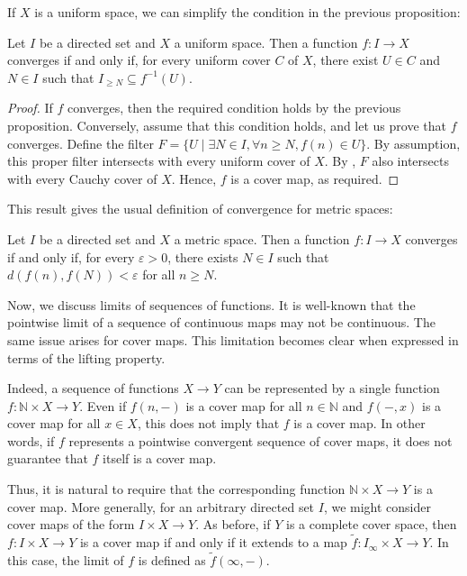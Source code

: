 \documentclass[reqno]{amsart}
\theoremstyle{definition}
\theoremstyle{remark}
\numberwithin{figure}{section}
\begin{document}
If $X$ is a uniform space, we can simplify the condition in the previous proposition:

\begin{prop}
Let $I$ be a directed set and $X$ a uniform space.
Then a function $f : I \to X$ converges if and only if, for every uniform cover $C$ of $X$, there exist $U \in C$ and $N \in I$ such that $I_{\geq N} \subseteq f^{-1}(U)$.
\end{prop}
\begin{proof}
If $f$ converges, then the required condition holds by the previous proposition.
Conversely, assume that this condition holds, and let us prove that $f$ converges.
Define the filter $F = \{ U \mid \exists N \in I, \forall n \geq N, f(n) \in U \}$.
By assumption, this proper filter intersects with every uniform cover of $X$.
By , $F$ also intersects with every Cauchy cover of $X$.
Hence, $f$ is a cover map, as required.
\end{proof}

This result gives the usual definition of convergence for metric spaces:

\begin{cor}
Let $I$ be a directed set and $X$ a metric space.
Then a function $f : I \to X$ converges if and only if, for every $\varepsilon > 0$, there exists $N \in I$ such that $d(f(n),f(N)) < \varepsilon$ for all $n \geq N$.
\end{cor}

Now, we discuss limits of sequences of functions.
It is well-known that the pointwise limit of a sequence of continuous maps may not be continuous.
The same issue arises for cover maps.
This limitation becomes clear when expressed in terms of the lifting property.

Indeed, a sequence of functions $X \to Y$ can be represented by a single function $f : \mathbb{N} \times X \to Y$.
Even if $f(n,-)$ is a cover map for all $n \in \mathbb{N}$ and $f(-,x)$ is a cover map for all $x \in X$, this does not imply that $f$ is a cover map.
In other words, if $f$ represents a pointwise convergent sequence of cover maps, it does not guarantee that $f$ itself is a cover map.

Thus, it is natural to require that the corresponding function $\mathbb{N} \times X \to Y$ is a cover map.
More generally, for an arbitrary directed set $I$, we might consider cover maps of the form $I \times X \to Y$. 
As before, if $Y$ is a complete cover space, then $f : I \times X \to Y$ is a cover map if and only if it extends to a map $\widetilde{f} : I_\infty \times X \to Y$.
In this case, the limit of $f$ is defined as $\widetilde{f}(\infty, -)$.
\end{document}
